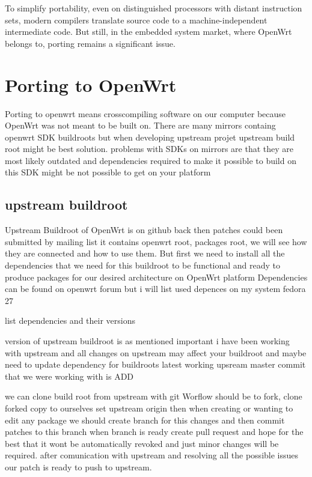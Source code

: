 To simplify portability, even on distinguished processors with distant instruction sets, modern compilers translate source code to a machine-independent intermediate code.
But still, in the embedded system market, where OpenWrt belongs to, porting remains a significant issue.

\section{Porting to OpenWrt} %

Porting to openwrt means crosscompiling software on our computer because OpenWrt was not meant to be built on.
There are many mirrors containg openwrt SDK buildroots but when developing upstream projet upstream build root might be best solution.
problems with SDKs on mirrors are that they are most likely outdated and dependencies required to make it possible to build on this SDK might be not possible to get on your platform

\subsection{upstream buildroot}

Upstream Buildroot of OpenWrt is on github back then patches could been submitted by mailing list
it contains openwrt root, packages root, we will see how they are connected and how to use them.
But first we need to install all the dependencies that we need for this buildroot to be functional and ready to produce packages for our desired architecture on OpenWrt platform
Dependencies can be found on openwrt forum but i will list used depences on my system fedora 27

list dependencies and their versions

version of upstream buildroot is as mentioned important i have been working with upstream and all changes on upstream may affect your buildroot and maybe need to update dependency for buildroots
latest working upsream master commit that we were working with is ADD

we can clone build root from upstream with git Worflow should be to fork, clone forked copy to ourselves set upstream origin then when creating or wanting to edit any package we should create branch for this changes and then commit patches to this branch
when branch is ready create pull request and hope for the best that it wont be automatically revoked and just minor changes will be required.
after comunication with upstream and resolving all the possible issues our patch is ready to push to upstream.

